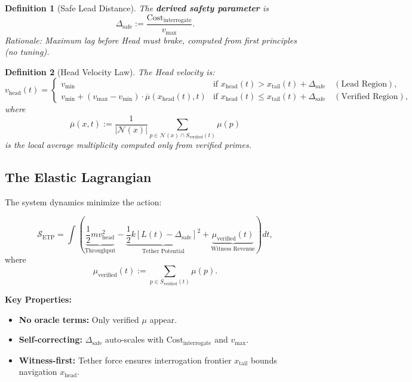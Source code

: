 \documentclass[12pt,a4paper]{article}
\newtheorem{definition}{Definition}[section]
\begin{document}
\begin{definition}[Safe Lead Distance]
The \textbf{derived safety parameter} is
\[
\Delta_{\text{safe}} := \frac{\text{Cost}_{\text{interrogate}}}{v_{\max}}.
\]
\textit{Rationale:} Maximum lag before Head must brake, computed from first principles (no tuning).
\end{definition}

\begin{definition}[Head Velocity Law]
\label{def:velocitylaw}
The Head velocity is:
\[
v_{\text{head}}(t) = 
\begin{cases}
v_{\min} & \text{if } x_{\text{head}}(t) > x_{\text{tail}}(t) + \Delta_{\text{safe}} \quad (\text{Lead Region}), \\
v_{\min} + (v_{\max} - v_{\min}) \cdot \overline{\mu}(x_{\text{head}}(t), t) & \text{if } x_{\text{head}}(t) \le x_{\text{tail}}(t) + \Delta_{\text{safe}} \quad (\text{Verified Region}),
\end{cases}
\]
where
\[
\overline{\mu}(x, t) := \frac{1}{|\mathcal{N}(x)|} \sum_{p \in \mathcal{N}(x) \cap S_{\text{verified}}(t)} \mu(p)
\]
is the local average multiplicity computed \textit{only from verified primes}.
\end{definition}

\subsection{The Elastic Lagrangian}

The system dynamics minimize the action:

\begin{equation}
\label{eq:action}
\mathcal{S}_{\text{ETP}} = \int \left( \underbrace{\frac{1}{2} m v_{\text{head}}^2}_{\text{Throughput}} - \underbrace{\frac{1}{2} k [L(t) - \Delta_{\text{safe}}]^2}_{\text{Tether Potential}} + \underbrace{\mu_{\text{verified}}(t)}_{\text{Witness Revenue}} \right) dt,
\end{equation}
where
\[
\mu_{\text{verified}}(t) := \sum_{p \in S_{\text{verified}}(t)} \mu(p).
\]

\textbf{Key Properties:}
\begin{itemize}
\item \textbf{No oracle terms:} Only verified $\mu$ appear.
\item \textbf{Self-correcting:} $\Delta_{\text{safe}}$ auto-scales with $\text{Cost}_{\text{interrogate}}$ and $v_{\max}$.
\item \textbf{Witness-first:} Tether force ensures interrogation frontier $x_{\text{tail}}$ bounds navigation $x_{\text{head}}$.
\end{itemize}
\end{document}
